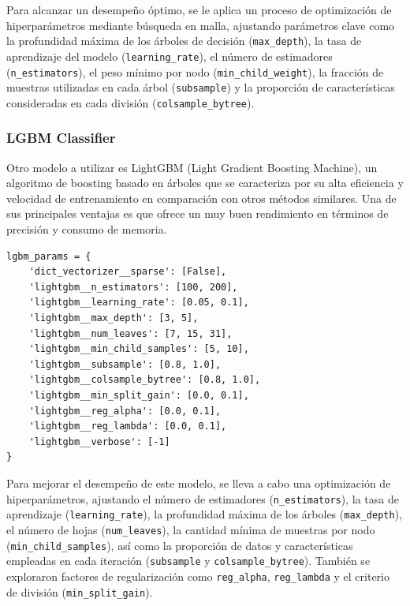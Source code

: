 \documentclass[11pt,a4paper,spanish]{book}
\numberwithin{equation}{chapter}
\numberwithin{figure}{chapter}
\begin{document}
Para alcanzar un desempeño óptimo, se le aplica un proceso de optimización de 
hiperparámetros mediante búsqueda en malla, ajustando parámetros clave como la 
profundidad máxima de los árboles de decisión (\lstinline|max_depth|), la tasa de 
aprendizaje del modelo (\lstinline|learning_rate|), el número de estimadores 
(\lstinline|n_estimators|), el peso mínimo por nodo (\lstinline|min_child_weight|), la 
fracción de muestras utilizadas en cada árbol (\lstinline|subsample|) y la proporción de 
características consideradas en cada división (\lstinline|colsample_bytree|). 


\subsubsection{LGBM Classifier}

Otro modelo a utilizar es LightGBM (Light Gradient Boosting Machine), un algoritmo de 
boosting basado en árboles que se caracteriza por su alta eficiencia y velocidad de 
entrenamiento en comparación con otros métodos similares. Una de sus principales ventajas 
es que ofrece un muy buen rendimiento en términos de precisión y consumo de memoria. 


\vspace{5mm}
\begin{lstlisting}
lgbm_params = {
    'dict_vectorizer__sparse': [False],
    'lightgbm__n_estimators': [100, 200],
    'lightgbm__learning_rate': [0.05, 0.1],  
    'lightgbm__max_depth': [3, 5],  
    'lightgbm__num_leaves': [7, 15, 31],  
    'lightgbm__min_child_samples': [5, 10],  
    'lightgbm__subsample': [0.8, 1.0],
    'lightgbm__colsample_bytree': [0.8, 1.0],
    'lightgbm__min_split_gain': [0.0, 0.1],  
    'lightgbm__reg_alpha': [0.0, 0.1],  
    'lightgbm__reg_lambda': [0.0, 0.1],  
    'lightgbm__verbose': [-1]  
}
\end{lstlisting}

Para mejorar el desempeño de este modelo, se lleva a cabo una optimización de 
hiperparámetros, ajustando el número de estimadores (\lstinline|n_estimators|), la tasa 
de aprendizaje (\lstinline|learning_rate|), la profundidad máxima de los árboles 
(\lstinline|max_depth|), el número de hojas (\lstinline|num_leaves|), la cantidad mínima 
de muestras por nodo (\lstinline|min_child_samples|), así como la proporción de datos y 
características empleadas en cada iteración (\lstinline|subsample| y 
\lstinline|colsample_bytree|). También se exploraron factores de regularización como 
\lstinline|reg_alpha|, \lstinline|reg_lambda| y el criterio de división 
(\lstinline|min_split_gain|). 
\end{document}
